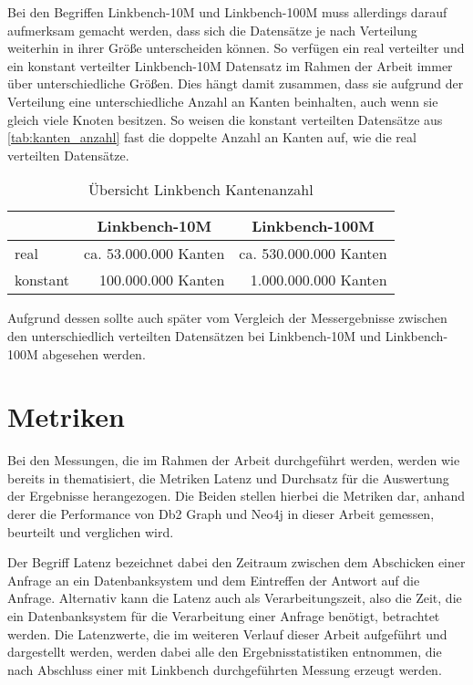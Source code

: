 Bei den Begriffen Linkbench-10M und Linkbench-100M muss allerdings darauf aufmerksam gemacht werden, dass sich die Datensätze je nach Verteilung weiterhin in ihrer Größe unterscheiden können. So verfügen ein real verteilter und ein konstant verteilter Linkbench-10M Datensatz im Rahmen der Arbeit immer über unterschiedliche Größen. Dies hängt damit zusammen, dass sie aufgrund der Verteilung eine unterschiedliche Anzahl an Kanten beinhalten, auch wenn sie gleich viele Knoten besitzen. So weisen die konstant verteilten Datensätze aus \autoref{tab:kanten_anzahl} fast die doppelte Anzahl an Kanten auf, wie die real verteilten Datensätze. 

\begin{table}[ht]
    \centering
    \begin{tabular}{l|r|r}
    \hline
    \rowcolor[HTML]{EFEFEF} 
    \multicolumn{1}{c|}{\cellcolor[HTML]{EFEFEF}\textbf{Verteilung}} & \multicolumn{1}{c|}{\cellcolor[HTML]{EFEFEF}\textbf{Linkbench-10M}} & \multicolumn{1}{c}{\cellcolor[HTML]{EFEFEF}\textbf{Linkbench-100M}} \\ \hline
    real & ca. 53.000.000 Kanten & ca. 530.000.000 Kanten \\
    konstant & 100.000.000 Kanten & 1.000.000.000 Kanten \\ \hline
    \end{tabular}
    \caption{Übersicht Linkbench Kantenanzahl}
    \label{tab:kanten_anzahl}
\end{table}

Aufgrund dessen sollte auch später vom Vergleich der Messergebnisse zwischen den unterschiedlich verteilten Datensätzen bei Linkbench-10M und Linkbench-100M abgesehen werden.

\section{Metriken}
\label{analyse:metriken}
Bei den Messungen, die im Rahmen der Arbeit durchgeführt werden, werden wie bereits in \cite{sigmod_tian} thematisiert, die Metriken Latenz und Durchsatz für die Auswertung der Ergebnisse herangezogen. Die Beiden stellen hierbei die Metriken dar, anhand derer die Performance von Db2 Graph und Neo4j in dieser Arbeit gemessen, beurteilt und verglichen wird.

Der Begriff Latenz bezeichnet dabei den Zeitraum zwischen dem Abschicken einer Anfrage an ein Datenbanksystem und dem Eintreffen der Antwort auf die Anfrage. Alternativ kann die Latenz auch als Verarbeitungszeit, also die Zeit, die ein Datenbanksystem für die Verarbeitung einer Anfrage benötigt, betrachtet werden. Die Latenzwerte, die im weiteren Verlauf dieser Arbeit aufgeführt und dargestellt werden, werden dabei alle den Ergebnisstatistiken entnommen, die nach Abschluss einer mit Linkbench durchgeführten Messung erzeugt werden. 

